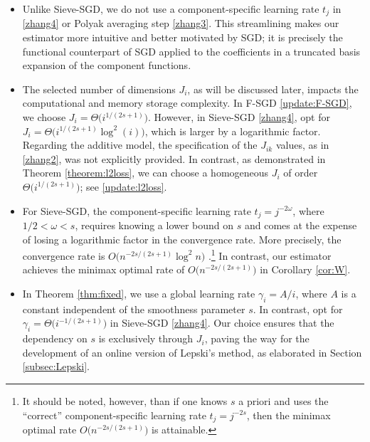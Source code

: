 \begin{itemize}
\item Unlike Sieve-SGD, we do not use a component-specific learning rate $t_j$ in \eqref{zhang4} or Polyak averaging step \eqref{zhang3}. This streamlining makes our estimator more intuitive and better motivated by SGD; it is precisely the functional counterpart of SGD applied to the coefficients in a truncated basis expansion of the component functions. 

\item The selected number of dimensions $J_i$, as will be discussed later, impacts the computational and memory storage complexity. In F-SGD \eqref{update:F-SGD}, we choose $J_i = \Theta\big(i^{1/(2s+1)}\big)$. However, in Sieve-SGD \eqref{zhang4}, \cite{zhang2022sieve} opt for $ J_{i} = \Theta \big( i^{1/(2s+1)}\log^2(i)\big) $, which is larger by a logarithmic factor. Regarding the additive model, the specification of the $J_{ik}$ values, as in \eqref{zhang2}, was not explicitly provided. In contrast, as demonstrated in Theorem \ref{theorem:l2loss}, we can choose a homogeneous $J_i$ of order $\Theta\big(i^{1/(2s+1)}\big)$; see \eqref{update:l2loss}.

\item For Sieve-SGD, the component-specific learning rate $t_j = j^{-2\omega}$, where $ 1/2 < \omega < s $, requires knowing a lower bound on $ s $ and comes at the expense of losing a logarithmic factor in the convergence rate. More precisely, the convergence rate is $O\big(n^{-2s/(2s+1)}\log^2 n\big)$ \cite[Theorem 6.3]{zhang2022sieve}.\footnote{It should be noted, however, than if one knows $s$ a priori and uses the ``correct'' component-specific learning rate $t_j = j^{-2s}$, then the minimax optimal rate $O\big(n^{-2s/(2s+1)}\big)$ is attainable.} In contrast, our estimator achieves the minimax optimal rate of $O\big(n^{-2s/(2s+1)}\big)$ in Corollary \ref{cor:W}.

\item In Theorem \ref{thm:fixed}, we use a global learning rate $ \gamma_i = A/i $, where $ A $ is a constant independent of the smoothness parameter $ s $.  In contrast, \cite{zhang2022sieve} opt for $ \gamma_i = \Theta\big(i^{-1/(2s+1)}\big) $ in Sieve-SGD \eqref{zhang4}. Our choice ensures that the dependency on $ s $ is exclusively through $ J_i $, paving the way for the development of an online version of Lepski's method, as elaborated in Section \ref{subsec:Lepski}.
\end{itemize}

